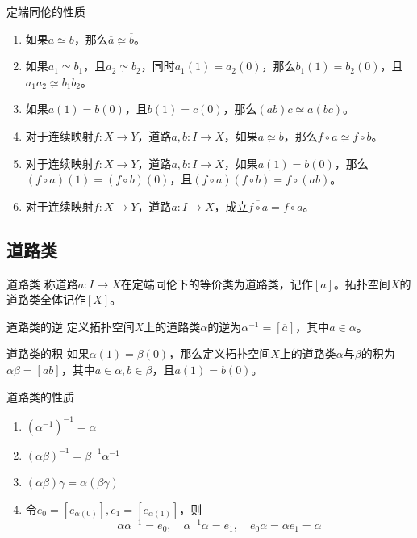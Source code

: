 \documentclass[lang = cn, scheme = chinese, thmcnt = section, usesamecnt]{elegantbook}
\begin{document}
\begin{proposition}{定端同伦的性质}
	\begin{enumerate}
		\item 如果$a \underset{\dot{}}{\simeq} b$，那么$\overline{a}\underset{\dot{}}{\simeq}\overline{b}$。
		\item 如果$a_1 \underset{\dot{}}{\simeq} b_1$，且$a_2 \underset{\dot{}}{\simeq} b_2$，同时$a_1(1)=a_2(0)$，那么$b_1(1)=b_2(0)$，且$a_1a_2\underset{\dot{}}{\simeq}b_1b_2$。
		\item 如果$a(1)=b(0)$，且$b(1)=c(0)$，那么$(ab)c \underset{\dot{}}{\simeq} a(b c)$。
		\item 对于连续映射$f:X\to Y$，道路$a,b: I \to X$，如果$a \underset{\dot{}}{\simeq} b$，那么$f\circ a \underset{\dot{}}{\simeq} f\circ b$。
		\item 对于连续映射$f:X\to Y$，道路$a,b: I \to X$，如果$a(1)=b(0)$，那么$(f\circ a)(1)=(f\circ b)(0)$，且$(f\circ a)(f\circ b)=f\circ(ab)$。
		\item 对于连续映射$f:X\to Y$，道路$a: I \to X$，成立$\overline{f\circ a}=f\circ\overline{a}$。
	\end{enumerate}
\end{proposition}

\subsection{道路类}

\begin{definition}{道路类}
	称道路$a: I \to X$在定端同伦下的等价类为道路类，记作$[a]$。拓扑空间$X$的道路类全体记作$[X]$。
\end{definition}

\begin{definition}{道路类的逆}
	定义拓扑空间$X$上的道路类$\alpha$的逆为$\alpha^{-1}=[\overline{a}]$，其中$a\in\alpha$。
\end{definition}

\begin{definition}{道路类的积}
	如果$\alpha(1)=\beta(0)$，那么定义拓扑空间$X$上的道路类$\alpha$与$\beta$的积为$\alpha\beta=[ab]$，其中$a\in \alpha,b\in\beta$，且$a(1)=b(0)$。
\end{definition}

\begin{proposition}{道路类的性质}
	\begin{enumerate}
		\item $(\alpha^{-1})^{-1}=\alpha$
		\item $(\alpha\beta)^{-1}=\beta^{-1}\alpha^{-1}$
		\item $(\alpha\beta)\gamma=\alpha(\beta\gamma)$
		\item 令$e_0=[e_{\alpha(0)}],e_1=[e_{\alpha(1)}]$，则%
		$$
		\alpha\alpha^{-1}=e_0,\quad 
		\alpha^{-1}\alpha=e_1,\quad 
		e_0\alpha=\alpha e_1=\alpha
		$$
	\end{enumerate}
\end{proposition}
\end{document}
